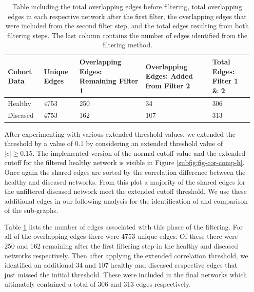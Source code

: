 \begin{table}[!btp]
\centering
\begin{tabular}{p{} p{} p{} p{} p{}}
  \toprule
 Cohort Data & Unique Edges & Overlapping Edges: Remaining Filter 1 & Overlapping Edges: Added from Filter 2 & Total Edges: Filter 1 \& 2\\ 
 \midrule
 Healthy & 4753 & 250 &  34 & 306 \\ 
 Diseased & 4753 & 162 & 107 & 313 \\ 
  \bottomrule
\end{tabular}
\caption[Table including the total overlapping edges before filtering, total overlapping edges in each respective network after the first filter, the overlapping edges that were included from the second filter step, and the total edges resulting from both filtering steps.]{Table including the total overlapping edges before filtering, total overlapping edges in each respective network after the first filter, the overlapping edges that were included from the second filter step, and the total edges resulting from both filtering steps. The last column contains the number of edges identified from the filtering method.}
\label{tab:edge_table2}
\end{table}
After experimenting with various extended threshold values, we extended the threshold by a value of 0.1 by considering an extended threshold value of $|c| \geq 0.15$. The implemented version of the normal cutoff value and the extended cutoff for the filtered healthy network is visible in Figure \ref{subfig:fig-cor-comp-h}. Once again the shared edges are sorted by the correlation difference between the healthy and diseased networks. From this plot a majority of the shared edges for the unfiltered diseased network meet the extended cutoff threshold. We use these additional edges in our following analysis for the identification of and comparison of the sub-graphs. 

Table \ref{tab:edge_table2} lists the number of edges associated with this phase of the filtering. For all of the overlapping edges there were 4753 unique edges. Of these there were 250 and 162 remaining after the first filtering step in the healthy and diseased networks respectively. Then after applying the extended correlation threshold, we identified an additional 34 and 107 healthy and diseased respective edges that just missed the initial threshold. These were included in the final networks which ultimately contained a total of 306 and 313 edges respectively.

